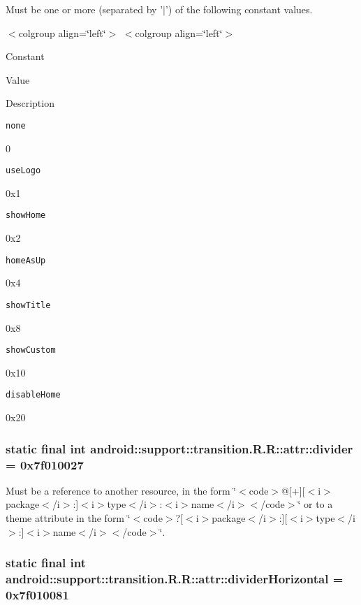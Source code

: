 Must be one or more (separated by '$|$') of the following constant values. \begin{TabularC}{0}
\hline
\end{TabularC}
$<$colgroup align=\char`\"{}left\char`\"{}$>$ $<$colgroup align=\char`\"{}left\char`\"{}$>$ 

Constant

Value

Description 

{\tt none}

0

{\tt useLogo}

0x1

{\tt showHome}

0x2

{\tt homeAsUp}

0x4

{\tt showTitle}

0x8

{\tt showCustom}

0x10

{\tt disableHome}

0x20\hypertarget{classandroid_1_1support_1_1transition_1_1_r_1_1attr_40d7bd25418d26b494822c3d7a48aea0}{
\subsubsection[{divider}]{\setlength{\rightskip}{0pt plus 5cm}static final int android::support::transition.R.R::attr::divider = 0x7f010027}}
\label{classandroid_1_1support_1_1transition_1_1_r_1_1attr_40d7bd25418d26b494822c3d7a48aea0}


Must be a reference to another resource, in the form \char`\"{}$<$code$>$@\mbox{[}+\mbox{]}\mbox{[}$<$i$>$package$<$/i$>$:\mbox{]}$<$i$>$type$<$/i$>$:$<$i$>$name$<$/i$>$$<$/code$>$\char`\"{} or to a theme attribute in the form \char`\"{}$<$code$>$?\mbox{[}$<$i$>$package$<$/i$>$:\mbox{]}\mbox{[}$<$i$>$type$<$/i$>$:\mbox{]}$<$i$>$name$<$/i$>$$<$/code$>$\char`\"{}. \hypertarget{classandroid_1_1support_1_1transition_1_1_r_1_1attr_1d03fb27a4a3f25461c7c3cf8a4ad1fb}{
\subsubsection[{dividerHorizontal}]{\setlength{\rightskip}{0pt plus 5cm}static final int android::support::transition.R.R::attr::dividerHorizontal = 0x7f010081}}
\label{classandroid_1_1support_1_1transition_1_1_r_1_1attr_1d03fb27a4a3f25461c7c3cf8a4ad1fb}


